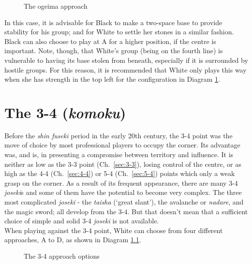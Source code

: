 \documentclass[a5paper,12pt,twoside]{book} %
\newcounter{joseki}                 %
\newcommand{\dref}[1]{Diagram \ref{#1}}
\newcommand{\addstufftotoc}[2][toc]{%
  \addtocontents{#1}{#2}}
\begin{document}
\begin{figure}[!htbp]
 
\vspace{-0.6cm}\caption{The ogeima approach}
\label{3-3:ogeima}
\end{figure}

In this case, it is advisable for Black to make a two-space base to provide stability for his group; and for White to settle her stones in a similar fashion. Black can also choose to play{\large\blackstone[2]} at A for a higher position, if the centre is important. Note, though, that White's group (being on the fourth line) is vulnerable to having its base stolen from beneath, especially if it is surrounded by hostile groups. For this reason, it is recommended that White only plays this way when she has strength in the top left for the configuration in \dref{3-3:ogeima}.\\
\addstufftotoc{\nobreak\smallskip\protect\par}

\chapter{The 3-4 (\textit{komoku}) \label{sec:3-4}}

Before the \textit{shin fuseki} period in the early 20th century, the 3-4 point was the move of choice by most professional players to occupy the corner. Its advantage was, and is, in presenting a compromise between territory and influence. It is neither as low as the 3-3 point (Ch.~\ref{sec:3-3}), losing control of the centre, or as high as the 4-4 (Ch.~\ref{sec:4-4}) or 5-4 (Ch.~\ref{sec:5-4}) points which only a weak grasp on the corner. As a result of its frequent appearance, there are many 3-4 \textit{joseki}s and some of them have the potential to become very complex. The three most complicated \textit{joseki} - the \textit{taisha} (`great slant'), the avalanche or \textit{nadare}, and the magic sword; all develop from the 3-4. But that doesn't mean that a sufficient choice of simple and solid 3-4 \textit{joseki} is not available.\\

When playing against the 3-4 point, White can choose from four different approaches, A to D, as shown in \dref{3-4:approach}. \\

\begin{figure}[!htbp]
 
\vspace{-0.6cm}\caption{The 3-4 approach options}
\label{3-4:approach}
\end{figure}
\end{document}
